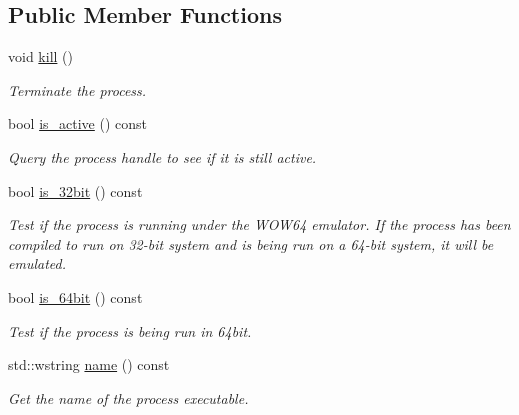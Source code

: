 \subsection*{Public Member Functions}
\begin{DoxyCompactItemize}
\item 
\mbox{\label{classdistant_1_1kernel__objects_1_1process__base_a3f1bf976485f4c55ab5e12b972382836}} 
void \mbox{\hyperlink{classdistant_1_1kernel__objects_1_1process__base_a3f1bf976485f4c55ab5e12b972382836}{kill}} ()
\begin{DoxyCompactList}\small\item\em Terminate the process. \end{DoxyCompactList}\item 
bool \mbox{\hyperlink{classdistant_1_1kernel__objects_1_1process__base_ac3d56fd3e4c92b1e1dbbf2f5f9242fbe}{is\+\_\+active}} () const
\begin{DoxyCompactList}\small\item\em Query the process handle to see if it is still active. \end{DoxyCompactList}\item 
bool \mbox{\hyperlink{classdistant_1_1kernel__objects_1_1process__base_a4c71065703937a737865428b03af8e99}{is\+\_\+32bit}} () const
\begin{DoxyCompactList}\small\item\em Test if the process is running under the W\+O\+W64 emulator. If the process has been compiled to run on 32-\/bit system and is being run on a 64-\/bit system, it will be emulated. \end{DoxyCompactList}\item 
bool \mbox{\hyperlink{classdistant_1_1kernel__objects_1_1process__base_a9ac787a611e73f5347cd25a850fa0122}{is\+\_\+64bit}} () const
\begin{DoxyCompactList}\small\item\em Test if the process is being run in 64bit. \end{DoxyCompactList}\item 
std\+::wstring \mbox{\hyperlink{classdistant_1_1kernel__objects_1_1process__base_a465314221bd0fbea3ce48ffcf7213578}{name}} () const
\begin{DoxyCompactList}\small\item\em Get the name of the process executable. \end{DoxyCompactList}\item 

\end{DoxyCompactItemize}
